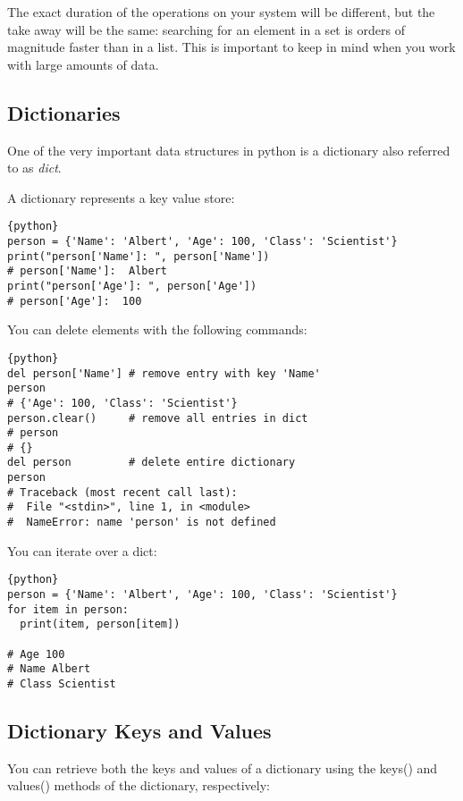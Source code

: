 The exact duration of the operations on your system will be different,
but the take away will be the same: searching for an element in a set is
orders of magnitude faster than in a list. This is important to keep in
mind when you work with large amounts of data.

\subsection{Dictionaries}\label{dictionaries}

One of the very important data structures in python is a dictionary also
referred to as \emph{dict}.

A dictionary represents a key value store:

\begin{lstlisting}{python}
person = {'Name': 'Albert', 'Age': 100, 'Class': 'Scientist'}
print("person['Name']: ", person['Name'])
# person['Name']:  Albert
print("person['Age']: ", person['Age'])
# person['Age']:  100
\end{lstlisting}

You can delete elements with the following commands:

\begin{lstlisting}{python}
del person['Name'] # remove entry with key 'Name'
person
# {'Age': 100, 'Class': 'Scientist'}
person.clear()     # remove all entries in dict
# person
# {}
del person         # delete entire dictionary
person
# Traceback (most recent call last):
#  File "<stdin>", line 1, in <module>
#  NameError: name 'person' is not defined
\end{lstlisting}

You can iterate over a dict:

\begin{lstlisting}{python}
person = {'Name': 'Albert', 'Age': 100, 'Class': 'Scientist'}
for item in person:
  print(item, person[item])

# Age 100
# Name Albert
# Class Scientist
\end{lstlisting}

\subsection{Dictionary Keys and Values}\label{dictionary-keys-and-values}

You can retrieve both the keys and values of a dictionary using the
keys() and values() methods of the dictionary, respectively:

